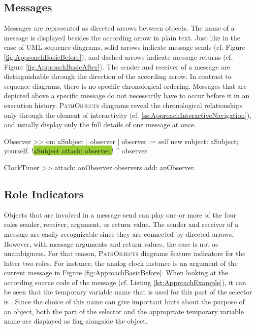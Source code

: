 \subsection{Messages}
\label{ss:ApproachNotationMessages}
Messages are represented as directed arrows between objects.
The name of a message is displayed besides the according arrow in plain text.
Just like in the case of UML sequence diagrams, solid arrows indicate message sends (cf. Figure \ref{fig:ApproachBasicBefore}), and dashed arrows indicate message returns (cf. Figure \ref{fig:ApproachBasicAfter}).
The sender and receiver of a message are distinguishable through the direction of the according arrow.
In contrast to sequence diagrams, there is no specific chronological ordering.
Messages that are depicted above a specific message do not necessarily have to occur before it in an execution history.
\textsc{PathObjects} diagrams reveal the chronological relationships only through the element of interactivity (cf. \ref{ss:ApproachInteractiveNavigation}), and usually display only the full details of one message at once.

\fboxsep=2.0pt
\begin{smalltalk}[caption={Underlying implementation of the scenario depicted in Figure \ref{fig:ApproachBasic}. The current step of the execution is highlighted.}, label=lst:ApproachExample, escapechar=!]
Observer >> on: aSubject
	| observer |
	observer := self new
		subject: aSubject;
		yourself.
	!\colorbox{YellowGreen}{aSubject attach: observer.}!
	^ observer.

ClockTimer >> attach: anObserver
	observers add: anObserver.
\end{smalltalk}

\subsection{Role Indicators}
\label{ss:ApproachNotationRoles}
Objects that are involved in a message send can play one or more of the four roles sender, receiver, argument, or return value.
The sender and receiver of a message are easily recognizable since they are connected by directed arrows.
However, with message arguments and return values, the case is not as unambiguous.
For that reason, \textsc{PathObjects} diagrams feature indicators for the latter two roles.
For instance, the analog clock instance is an argument of the current message in Figure \ref{fig:ApproachBasicBefore}.
When looking at the according source code of the  message (cf. Listing \ref{lst:ApproachExample}), it can be seen that the temporary variable name that is used for this part of the selector is .
Since the choice of this name can give important hints about the purpose of an object,
both the part of the selector and the appropriate temporary variable name are displayed as flag alongside the object.

